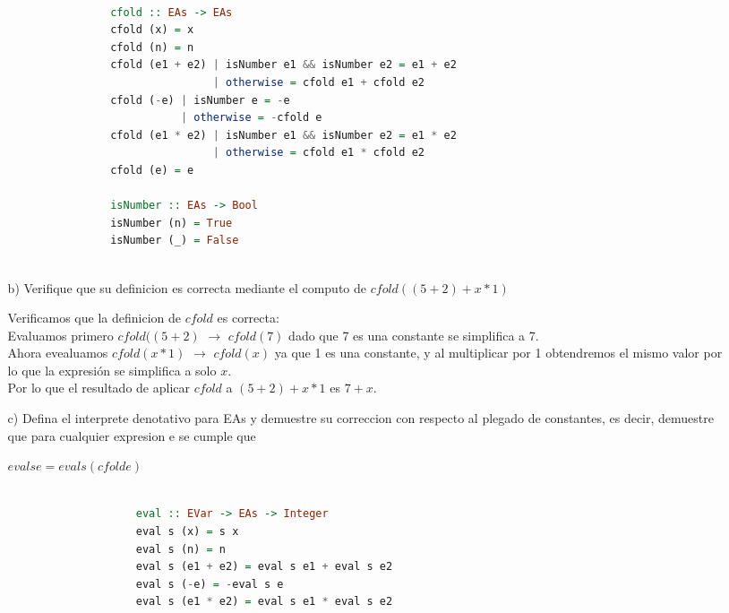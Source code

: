 \documentclass{article}
\begin{document}
\begin{itemize}
\begin{itemize}
                \begin{lstlisting}[language=Haskell]

                cfold :: EAs -> EAs
                cfold (x) = x
                cfold (n) = n
                cfold (e1 + e2) | isNumber e1 && isNumber e2 = e1 + e2
                                | otherwise = cfold e1 + cfold e2
                cfold (-e) | isNumber e = -e
                           | otherwise = -cfold e
                cfold (e1 * e2) | isNumber e1 && isNumber e2 = e1 * e2
                                | otherwise = cfold e1 * cfold e2
                cfold (e) = e

                isNumber :: EAs -> Bool
                isNumber (n) = True
                isNumber (_) = False
                
                \end{lstlisting}

                \item[b)] Verifique que su definicion es correcta mediante el computo de $cfold((5 + 2) + x * 1)$

                Verificamos que la definicion de $cfold$ es correcta:\\
                Evaluamos primero $cfold((5 + 2)$ $\rightarrow$ $cfold(7)$ dado que 7 es una constante se simplifica a 7.\\

                Ahora evealuamos $cfold(x * 1)$ $\rightarrow$ $cfold(x)$ ya que 1 es una constante, y al multiplicar por 1 obtendremos el mismo valor por lo que la expresión se simplifica a solo $x$.\\

                Por lo que el resultado de aplicar $cfold$ a $(5 + 2) + x * 1$ es $7 + x$.\\
                
                \item[c)] Defina el interprete denotativo para EAs y demuestre su correccion con respecto al plegado de constantes, es decir, demuestre que para cualquier expresion e se cumple que
                    \begin{center}
                        $eval s e = eval s (cfold e)$
                    \end{center}

                \begin{lstlisting}[language=Haskell]
                
                    eval :: EVar -> EAs -> Integer
                    eval s (x) = s x  
                    eval s (n) = n    
                    eval s (e1 + e2) = eval s e1 + eval s e2 
                    eval s (-e) = -eval s e                 
                    eval s (e1 * e2) = eval s e1 * eval s e2
                    

\end{lstlisting}
\end{itemize}
\end{itemize}
\end{document}
